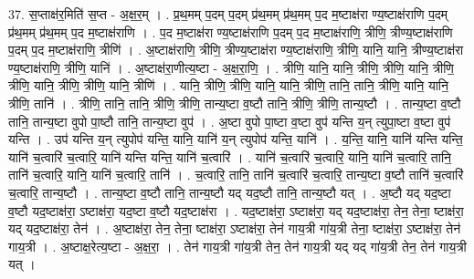 \documentclass[17pt]{extarticle}
\begin{document}
37. स॒प्ताक्ष॑र॒मिति॑ स॒प्त - अ॒क्ष॒र॒म् । . प्र॒थ॒मम् प॒दम् प॒दम् प्र॑थ॒मम् प्र॑थ॒मम् प॒द म॒ष्टाक्ष॑रा ण्य॒ष्टाक्ष॑राणि प॒दम् प्र॑थ॒मम् प्र॑थ॒मम् प॒द म॒ष्टाक्ष॑राणि । . प॒द म॒ष्टाक्ष॑रा ण्य॒ष्टाक्ष॑राणि प॒दम् प॒द म॒ष्टाक्ष॑राणि॒ त्रीणि॒ त्रीण्य॒ष्टाक्ष॑राणि प॒दम् प॒द म॒ष्टाक्ष॑राणि॒ त्रीणि॑ । . अ॒ष्टाक्ष॑राणि॒ त्रीणि॒ त्रीण्य॒ष्टाक्ष॑रा ण्य॒ष्टाक्ष॑राणि॒ त्रीणि॒ यानि॒ यानि॒ त्रीण्य॒ष्टाक्ष॑रा
ण्य॒ष्टाक्ष॑राणि॒ त्रीणि॒ यानि॑ । . अ॒ष्टाक्ष॑रा॒णीत्य॒ष्टा - अ॒क्ष॒रा॒णि॒ । . त्रीणि॒ यानि॒ यानि॒ त्रीणि॒ त्रीणि॒ यानि॒ त्रीणि॒ त्रीणि॒ यानि॒ त्रीणि॒ त्रीणि॒ यानि॒ त्रीणि॑ । . यानि॒ त्रीणि॒ त्रीणि॒ यानि॒ यानि॒ त्रीणि॒ तानि॒ तानि॒ त्रीणि॒ यानि॒ यानि॒ त्रीणि॒ तानि॑ । . त्रीणि॒ तानि॒ तानि॒ त्रीणि॒ त्रीणि॒ तान्य॒ष्टा व॒ष्टौ तानि॒ त्रीणि॒ त्रीणि॒ तान्य॒ष्टौ । . तान्य॒ष्टा व॒ष्टौ तानि॒ तान्य॒ष्टा वुपो पा॒ष्टौ तानि॒ तान्य॒ष्टा वुप॑ । . अ॒ष्टा वुपो पा॒ष्टा व॒ष्टा वुप॑ यन्ति य॒न् त्युपा॒ष्टा व॒ष्टा वुप॑ यन्ति । . उप॑ यन्ति य॒न् त्युपोप॑ यन्ति॒ यानि॒ यानि॑ य॒न् त्युपोप॑ यन्ति॒ यानि॑ । . य॒न्ति॒ यानि॒ यानि॑ यन्ति यन्ति॒ यानि॑ च॒त्वारि॑ च॒त्वारि॒ यानि॑ यन्ति यन्ति॒ यानि॑ च॒त्वारि॑ । . यानि॑ च॒त्वारि॑ च॒त्वारि॒ यानि॒ यानि॑ च॒त्वारि॒ तानि॒ तानि॑ च॒त्वारि॒ यानि॒ यानि॑ च॒त्वारि॒ तानि॑ । . च॒त्वारि॒ तानि॒ तानि॑ च॒त्वारि॑ च॒त्वारि॒ तान्य॒ष्टा व॒ष्टौ तानि॑ च॒त्वारि॑ च॒त्वारि॒ तान्य॒ष्टौ । . तान्य॒ष्टा व॒ष्टौ तानि॒ तान्य॒ष्टौ यद् यद॒ष्टौ तानि॒ तान्य॒ष्टौ यत् । . अ॒ष्टौ यद् यद॒ष्टा व॒ष्टौ यद॒ष्टाक्ष॑रा॒ ऽष्टाक्ष॑रा॒ यद॒ष्टा व॒ष्टौ यद॒ष्टाक्ष॑रा । . यद॒ष्टाक्ष॑रा॒ ऽष्टाक्ष॑रा॒ यद् यद॒ष्टाक्ष॑रा॒ तेन॒ तेना॒ ष्टाक्ष॑रा॒ यद् यद॒ष्टाक्ष॑रा॒ तेन॑ । . अ॒ष्टाक्ष॑रा॒ तेन॒ तेना॒ ष्टाक्ष॑रा॒ ऽष्टाक्ष॑रा॒ तेन॑ गाय॒त्री गा॑य॒त्री तेना॒ ष्टाक्ष॑रा॒ ऽष्टाक्ष॑रा॒ तेन॑ गाय॒त्री । . अ॒ष्टाक्ष॒रेत्य॒ष्टा - अ॒क्ष॒रा॒ । . तेन॑ गाय॒त्री गा॑य॒त्री तेन॒ तेन॑ गाय॒त्री यद् यद् गा॑य॒त्री तेन॒ तेन॑ गाय॒त्री यत् । \newline
\pagebreak
{}
\end{document}
